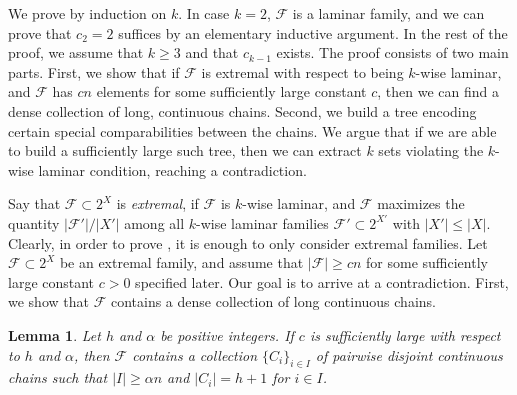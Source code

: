 \documentclass[11pt]{article}
\newtheorem{lemma}[lemma]{Lemma}
\theoremstyle{definition}
\newcommand{\cF}{\mathcal{F}}
\begin{document}
We prove  by induction on $k$. In case $k=2$, $\cF$ is a laminar family, and we can prove that $c_2=2$ suffices by an elementary inductive argument. In the rest of the proof, we assume that $k\geq 3$ and that $c_{k-1}$ exists. The proof consists of two main parts. First, we show that if $\cF$ is extremal with respect to being $k$-wise laminar, and $\cF$ has $cn$ elements for some sufficiently large constant $c$, then we can find a dense collection of long, continuous chains. Second, we build a tree encoding certain special comparabilities between the chains. We argue that if we are able to build a sufficiently large such tree, then we can extract $k$ sets violating the $k$-wise laminar condition, reaching a contradiction.

\medskip

Say that $\cF\subset 2^X$ is \emph{extremal}, if $\cF$ is $k$-wise laminar, and $\cF$ maximizes the quantity $|\cF'|/|X'|$ among all $k$-wise laminar families $\cF'\subset 2^{X'}$ with $|X'|\leq |X|$. Clearly, in order to prove , it is enough to only consider extremal families. Let $\cF\subset 2^X$ be an extremal family, and assume that $|\cF|\geq cn$ for some sufficiently large constant $c>0$ specified later. Our goal is to arrive at a contradiction. First, we show that $\cF$ contains a dense collection of long continuous chains.

\begin{lemma}\label{lemma:chain_extraction}
Let $h$ and $\alpha$ be positive integers. If $c$ is sufficiently large with respect to $h$ and $\alpha$, then $\cF$ contains a collection $\{C_i\}_{i\in I}$ of pairwise disjoint continuous chains such that $|I|\geq \alpha n$ and $|C_i|=h+1$ for $i\in I$.
\end{lemma}
\end{document}
